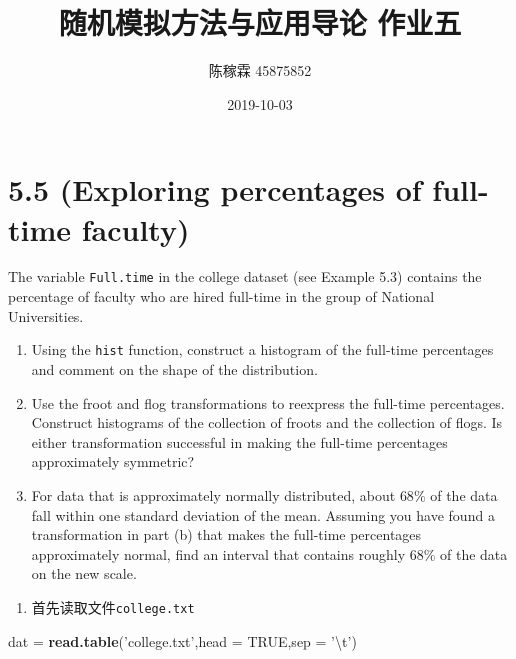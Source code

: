 \documentclass[]{article}
\title{随机模拟方法与应用导论 作业五}
\author{陈稼霖 45875852}
\date{2019-10-03}
\newenvironment{Shaded}{\begin{snugshade}}{\end{snugshade}}
\newcommand{\CharTok}[1]{\textcolor[rgb]{0.31,0.60,0.02}{#1}}
\newcommand{\DataTypeTok}[1]{\textcolor[rgb]{0.13,0.29,0.53}{#1}}
\newcommand{\KeywordTok}[1]{\textcolor[rgb]{0.13,0.29,0.53}{\textbf{#1}}}
\newcommand{\NormalTok}[1]{#1}
\newcommand{\OtherTok}[1]{\textcolor[rgb]{0.56,0.35,0.01}{#1}}
\newcommand{\StringTok}[1]{\textcolor[rgb]{0.31,0.60,0.02}{#1}}
\providecommand{\tightlist}{%
  \setlength{\itemsep}{0pt}\setlength{\parskip}{0pt}}
\begin{document}
\maketitle

\hypertarget{exploring-percentages-of-full-time-faculty}{%
\section{5.5 (Exploring percentages of full-time
faculty)}\label{exploring-percentages-of-full-time-faculty}}

The variable \texttt{Full.time} in the college dataset (see Example 5.3)
contains the percentage of faculty who are hired full-time in the group
of National Universities.

\begin{enumerate}
\def\labelenumi{\alph{enumi}.}
\item
  Using the \texttt{hist} function, construct a histogram of the
  full-time percentages and comment on the shape of the distribution.
\item
  Use the froot and flog transformations to reexpress the full-time
  percentages. Construct histograms of the collection of froots and the
  collection of flogs. Is either transformation successful in making the
  full-time percentages approximately symmetric?
\item
  For data that is approximately normally distributed, about \(68\%\) of
  the data fall within one standard deviation of the mean. Assuming you
  have found a transformation in part (b) that makes the full-time
  percentages approximately normal, find an interval that contains
  roughly \(68\%\) of the data on the new scale.
\end{enumerate}

\begin{enumerate}
\def\labelenumi{\alph{enumi}.}
\tightlist
\item
  首先读取文件\texttt{college.txt}
\end{enumerate}

\begin{Shaded}
\begin{Highlighting}[]
\NormalTok{dat =}\StringTok{ }\KeywordTok{read.table}\NormalTok{(}\StringTok{'college.txt'}\NormalTok{,}\DataTypeTok{head =} \OtherTok{TRUE}\NormalTok{,}\DataTypeTok{sep =} \StringTok{'}\CharTok{\textbackslash{}t}\StringTok{'}\NormalTok{)}
\end{Highlighting}
\end{Shaded}
\end{document}
